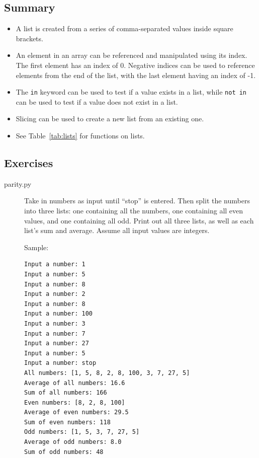 \documentclass[11pt]{cselabheader}
\begin{document}
\subsection{Summary}

\begin{itemize}
  \item A list is created from a series of comma-separated values inside square
    brackets.  
  \item An element in an array can be referenced and manipulated
    using its index. The first element has an index of 0. Negative indices can
    be used to reference elements from the end of the list, with the last
    element having an index of -1.
  \item The \lstinline{in} keyword can be used to test if a value exists in a
    list, while \lstinline!not in! can be used to test if a value does not exist
    in a list.
  \item Slicing can be used to create a new list from an existing one.
  \item See Table~\ref{tab:lists} for functions on lists.
\end{itemize}

\subsection{Exercises}
\label{subsec:listsex}

\begin{description}
  \item[parity.py] Take in numbers as input until ``stop'' is entered. Then split the numbers into three lists: one containing all the numbers, one containing all even values, and one containing all odd. Print out all three lists, as well as each list's sum and average. Assume all input values are integers.

    Sample:
\begin{lstlisting}[style=bash]
Input a number: 1
Input a number: 5
Input a number: 8
Input a number: 2
Input a number: 8
Input a number: 100
Input a number: 3
Input a number: 7
Input a number: 27
Input a number: 5
Input a number: stop
All numbers: [1, 5, 8, 2, 8, 100, 3, 7, 27, 5]
Average of all numbers: 16.6
Sum of all numbers: 166
Even numbers: [8, 2, 8, 100]
Average of even numbers: 29.5
Sum of even numbers: 118
Odd numbers: [1, 5, 3, 7, 27, 5]
Average of odd numbers: 8.0
Sum of odd numbers: 48
\end{lstlisting}
\end{description}
\end{document}
